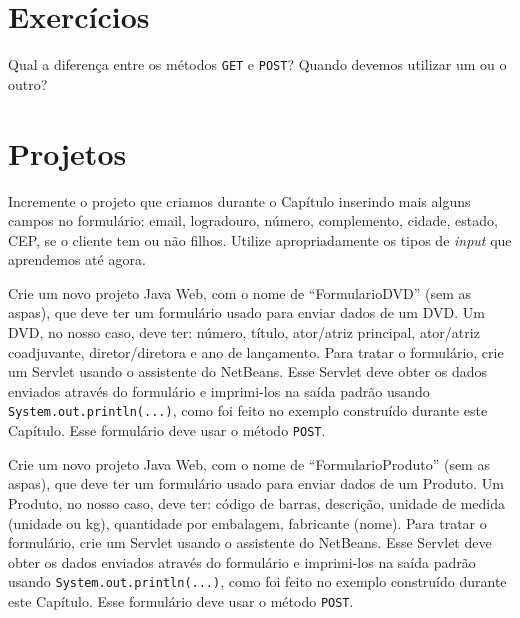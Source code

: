 \section{Exercícios}

\begin{exercicioSemArquivo}{}{}{}
    Qual a diferença entre os métodos \texttt{GET} e \texttt{POST}? Quando devemos utilizar um ou o outro?
\end{exercicioSemArquivo}

\section{Projetos}

\begin{projetoSemArquivo}{}{}{}
    Incremente o projeto que criamos durante o Capítulo inserindo mais alguns campos no formulário: email, logradouro, número, complemento, cidade, estado, CEP, se o cliente tem ou não filhos. Utilize apropriadamente os tipos de \textit{input} que aprendemos até agora.
\end{projetoSemArquivo}

\begin{projetoSemArquivo}{}{}{}
    Crie um novo projeto Java Web, com o nome de ``FormularioDVD'' (sem as aspas), que deve ter um formulário usado para enviar dados de um DVD. Um DVD, no nosso caso, deve ter: número, título, ator/atriz principal, ator/atriz coadjuvante, diretor/diretora e ano de lançamento. Para tratar o formulário, crie um Servlet usando o assistente do NetBeans. Esse Servlet deve obter os dados enviados através do formulário e imprimi-los na saída padrão usando \texttt{System.out.println(...)}, como foi feito no exemplo construído durante este Capítulo. Esse formulário deve usar o método \texttt{POST}.
\end{projetoSemArquivo}

\begin{projetoSemArquivo}{}{}{}
    Crie um novo projeto Java Web, com o nome de ``FormularioProduto'' (sem as aspas), que deve ter um formulário usado para enviar dados de um Produto. Um Produto, no nosso caso, deve ter: código de barras, descrição, unidade de medida (unidade ou kg), quantidade por embalagem, fabricante (nome). Para tratar o formulário, crie um Servlet usando o assistente do NetBeans. Esse Servlet deve obter os dados enviados através do formulário e imprimi-los na saída padrão usando \texttt{System.out.println(...)}, como foi feito no exemplo construído durante este Capítulo. Esse formulário deve usar o método \texttt{POST}.
\end{projetoSemArquivo}


